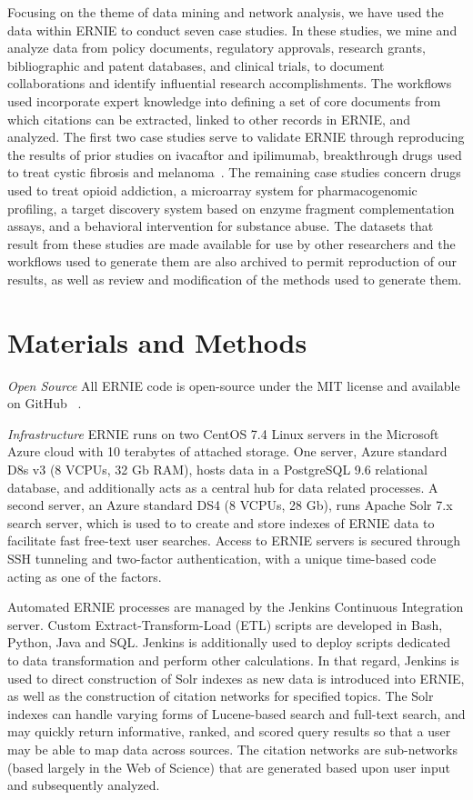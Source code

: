 \documentclass[review]{elsarticle}
\begin{document}
Focusing on the theme of data mining and network analysis, we have used the data within ERNIE to conduct seven case studies. In these studies, we mine and analyze data from policy documents, regulatory approvals, research grants, bibliographic and patent databases, and clinical trials, to document collaborations and identify influential research accomplishments. The workflows used incorporate expert knowledge into defining a set of core documents from which citations can be extracted, linked to other records in ERNIE, and analyzed. The first two case studies serve to validate ERNIE through reproducing the results of prior studies on ivacaftor and ipilimumab, breakthrough drugs used to treat cystic fibrosis and melanoma~\cite{Williams2015}. The remaining case studies concern drugs used to treat opioid addiction, a microarray system for pharmacogenomic profiling, a target discovery system based on enzyme fragment complementation assays, and a behavioral intervention for substance abuse. The datasets that result from these studies are made available for use by other researchers and the workflows used to generate them are also archived to permit reproduction of our results, as well as review and modification of the methods used to generate them.

\section*{Materials and Methods}

\emph{Open Source} All ERNIE code is open-source under the MIT license and available on GitHub ~\cite{GithubERNIE2017}.

\emph{Infrastructure} ERNIE runs on two CentOS 7.4 Linux servers in the Microsoft Azure cloud with 10 terabytes of
attached storage.
One server, Azure standard D8s v3 (8 VCPUs, 32 Gb RAM), hosts data in a PostgreSQL 9.6 relational database, and
additionally acts as a central hub for data related processes.
A second server, an Azure standard DS4 (8 VCPUs, 28 Gb), runs Apache Solr 7.x search server, which is used to to create
and store indexes of ERNIE data to facilitate fast free-text user searches.
Access to ERNIE servers is secured through SSH tunneling and two-factor authentication, with a unique time-based code
acting as one of the factors.

Automated ERNIE processes are managed by the Jenkins Continuous Integration server.
Custom Extract-Transform-Load (ETL) scripts are developed in Bash, Python, Java and SQL.
Jenkins is additionally used to deploy scripts dedicated to data transformation and perform other
calculations.
In that regard, Jenkins is used to direct construction of Solr indexes as new data is introduced into
ERNIE, as well as the construction of citation networks for specified topics.
The Solr indexes can handle varying forms of Lucene-based search and full-text search, and may quickly return
informative, ranked, and scored query results so that a user may be able to map data across sources.
The citation networks are sub-networks (based largely in the Web of Science) that are generated based upon user input
and subsequently analyzed.
\end{document}
